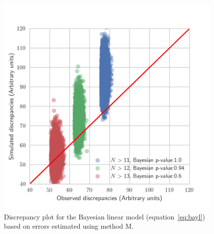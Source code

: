 \documentclass[a4paper,fleqn,usenatbib]{mnras}
\begin{document}
\begin{figure}
	\includegraphics[scale=0.7]{discl2.png}
    \caption{Discrepancy plot for the Bayesian linear model (equation~\ref{eq:bayl}) based on errors estimated using method M. }
    \label{fig:discl2}
\end{figure}
\end{document}
